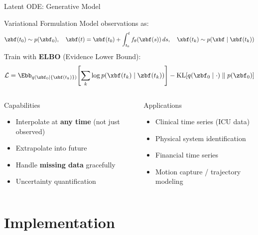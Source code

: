 \documentclass[aspectratio=169,xcolor=dvipsnames,svgnames,x11names,fleqn]{beamer}
\begin{document}
\begin{frame}{Latent ODE: Generative Model}
\scriptsize

\begin{tblockFrost}{Variational Formulation}
Model observations as:
$$
  \zbf(t_0) \sim p(\zbf_0), \quad
  \zbf(t) = \zbf(t_0) + \int_{t_0}^{t} f_\theta(\zbf(s))\, ds, \quad
  \xbf(t_k) \sim p(\xbf \mid \zbf(t_k))
$$
Train with \textbf{ELBO} (Evidence Lower Bound):
$$
  \mathcal{L} = \Ebb_{q(\zbf_0 | \{\xbf(t_k)\})}\!\left[\sum_k \log p(\xbf(t_k) \mid \zbf(t_k))\right] - \text{KL}\!\left[q(\zbf_0 \mid \cdot) \;\|\; p(\zbf_0)\right]
$$
\end{tblockFrost}
\vspace{4pt}
\begin{columns}
\begin{block}{Capabilities}
\begin{itemize}
  \item Interpolate at \textbf{any time} (not just observed)
  \item Extrapolate into future
  \item Handle \textbf{missing data} gracefully
  \item Uncertainty quantification
\end{itemize}
\end{block}
\begin{block}{Applications}
\begin{itemize}
  \item Clinical time series (ICU data)
  \item Physical system identification
  \item Financial time series
  \item Motion capture / trajectory modeling
\end{itemize}
\end{block}
\end{columns}
\end{frame}

\section{Implementation}
 
\end{document}
